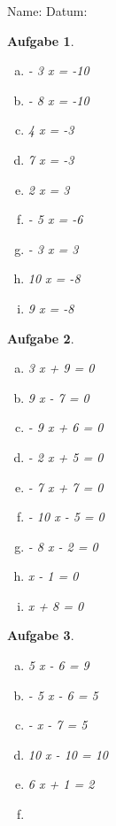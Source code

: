 \documentclass[12pt,fleqn]{article}
\theoremstyle{aufg}
\newtheorem{aufgabe}{Aufgabe}
\theoremstyle{bsp}
\begin{document}
 
    \begin{flushleft}
Name: \hspace{12cm} Datum:\begin{aufgabe}\framebox{\qquad/} ~ \\ 
\begin{multicols}{3} 
\begin{enumerate}[a)] 
\item 
- 3 x = -10
\item 
- 8 x = -10
\item 
4 x = -3
\item 
7 x = -3
\item 
2 x = 3
\item 
- 5 x = -6
\item 
- 3 x = 3
\item 
10 x = -8
\item 
9 x = -8
\end{enumerate} 
\end{multicols} 
\end{aufgabe} 
\begin{aufgabe}\framebox{\qquad/} ~ \\ 
\begin{multicols}{3} 
\begin{enumerate}[a)] 
\item 
3 x + 9 = 0
\item 
9 x - 7 = 0
\item 
- 9 x + 6 = 0
\item 
- 2 x + 5 = 0
\item 
- 7 x + 7 = 0
\item 
- 10 x - 5 = 0
\item 
- 8 x - 2 = 0
\item 
x - 1 = 0
\item 
x + 8 = 0
\end{enumerate} 
\end{multicols} 
\end{aufgabe} 
\begin{aufgabe}\framebox{\qquad/} ~ \\ 
\begin{multicols}{3} 
\begin{enumerate}[a)] 
\item 
5 x - 6 = 9
\item 
- 5 x - 6 = 5
\item 
- x - 7 = 5
\item 
10 x - 10 = 10
\item 
6 x + 1 = 2
\item 

\end{enumerate}
\end{multicols}
\end{aufgabe}
\end{flushleft}
\end{document}
